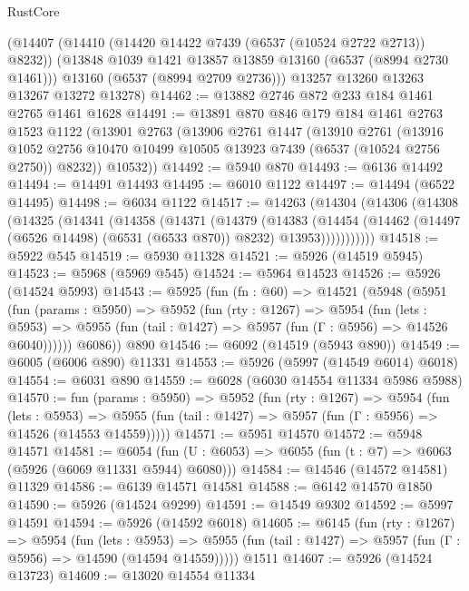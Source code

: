 \begin{lexlean}{RustCore}
\begin{coremodule}
      (@14407
        (@14410 (@14420 @14422 @7439 (@6537 (@10524 @2722 @2713)) @8232))
        (@13848 @1039 @1421 @13857 @13859 @13160 (@6537 (@8994 @2730 @1461)))
        @13160
        (@6537 (@8994 @2709 @2736)))
      @13257
      @13260
      @13263
      @13267
      @13272
      @13278)
@14462 := @13882 @2746 @872 @233 @184 @1461 @2765 @1461 @1628
@14491 := @13891
    @870
    @846
    @179
    @184
    @1461
    @2763
    @1523
    @1122
    (@13901
      @2763
      (@13906
        @2761
        @1447
        (@13910
          @2761
          (@13916 @1052 @2756 @10470 @10499 @10505 @13923 @7439 (@6537 (@10524 @2756 @2750)) @8232))
        @10532))
@14492 := @5940 @870
@14493 := @6136 @14492
@14494 := @14491 @14493
@14495 := @6010 @1122
@14497 := @14494 (@6522 @14495)
@14498 := @6034 @1122
@14517 := @14263
    (@14304
      (@14306
        (@14308
          (@14325
            (@14341
              (@14358
                (@14371
                  (@14379
                    (@14383
                      (@14454
                        (@14462 (@14497 (@6526 @14498) (@6531 (@6533 @870)) @8232) @13953)))))))))))
@14518 := @5922 @545
@14519 := @5930 @11328
@14521 := @5926 (@14519 @5945)
@14523 := @5968 (@5969 @545)
@14524 := @5964 @14523
@14526 := @5926 (@14524 @5993)
@14543 := @5925
    (fun (fn : @60) =>
    @14521
      (@5948
        (@5951
          (fun (params : @5950) =>
          @5952
            (fun (rty : @1267) =>
            @5954
              (fun (lets : @5953) =>
              @5955 (fun (tail : @1427) => @5957 (fun (Γ : @5956) => @14526 @6040))))))
        @6086))
    @890
@14546 := @6092 (@14519 (@5943 @890))
@14549 := @6005 (@6006 @890) @11331
@14553 := @5926 (@5997 (@14549 @6014) @6018)
@14554 := @6031 @890
@14559 := @6028 (@6030 @14554 @11334 @5986 @5988)
@14570 := fun (params : @5950) =>
  @5952
    (fun (rty : @1267) =>
    @5954
      (fun (lets : @5953) =>
      @5955 (fun (tail : @1427) => @5957 (fun (Γ : @5956) => @14526 (@14553 @14559)))))
@14571 := @5951 @14570
@14572 := @5948 @14571
@14581 := @6054
    (fun (U : @6053) => @6055 (fun (t : @7) => @6063 (@5926 (@6069 @11331 @5944) @6080)))
@14584 := @14546 (@14572 @14581) @11329
@14586 := @6139 @14571 @14581
@14588 := @6142 @14570 @1850
@14590 := @5926 (@14524 @9299)
@14591 := @14549 @9302
@14592 := @5997 @14591
@14594 := @5926 (@14592 @6018)
@14605 := @6145
    (fun (rty : @1267) =>
    @5954
      (fun (lets : @5953) =>
      @5955 (fun (tail : @1427) => @5957 (fun (Γ : @5956) => @14590 (@14594 @14559)))))
    @1511
@14607 := @5926 (@14524 @13723)
@14609 := @13020 @14554 @11334

\end{coremodule}
\end{lexlean}
